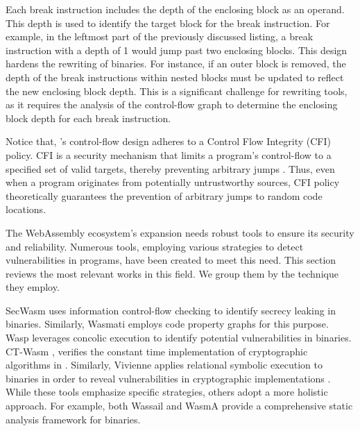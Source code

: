 

Each break instruction includes the depth of the enclosing block as an operand. 
This depth is used to identify the target block for the break instruction. 
For example, in the leftmost part of the previously discussed listing, a break instruction with a depth of 1 would jump past two enclosing blocks.
This design hardens the rewriting of \Wasm binaries.
For instance, if an outer block is removed, the depth of the break instructions within nested blocks must be updated to reflect the new enclosing block depth.
This is a significant challenge for rewriting tools, as it requires the analysis of the control-flow graph to determine the enclosing block depth for each break instruction.

Notice that, \Wasm's control-flow design adheres to a Control Flow Integrity (CFI) policy. 
CFI is a security mechanism that limits a program's control-flow to a specified set of valid targets, thereby preventing arbitrary jumps \cite{cfi}.
Thus, even when a \Wasm program originates from potentially untrustworthy sources, CFI policy theoretically guarantees the prevention of arbitrary jumps to random code locations.


\label{background:wasm:analysis}

The WebAssembly ecosystem's expansion needs robust tools to ensure its security and reliability. 
Numerous tools, employing various strategies to detect vulnerabilities in \Wasm programs, have been created to meet this need.%
This section reviews the most relevant works in this field. 
We group them by the technique they employ. 

 SecWasm \cite{secwasm} uses information control-flow checking to identify secrecy leaking in \Wasm binaries. 
Similarly, Wasmati \cite{wasmati} employs code property graphs for this purpose. 
Wasp \cite{Wasp} leverages concolic execution to identify potential vulnerabilities in \Wasm binaries. 
CT-Wasm \cite{ctwasm}, verifies the constant time implementation of cryptographic algorithms in \Wasm. 
Similarly, Vivienne applies relational symbolic execution to \Wasm binaries in order to reveal vulnerabilities in cryptographic implementations \cite{Vivienne}. 
While these tools emphasize specific strategies, others adopt a more holistic approach. 
For example, both Wassail \cite{wassail} and WasmA \cite{WasmA} provide a comprehensive static analysis framework for \Wasm binaries. 


